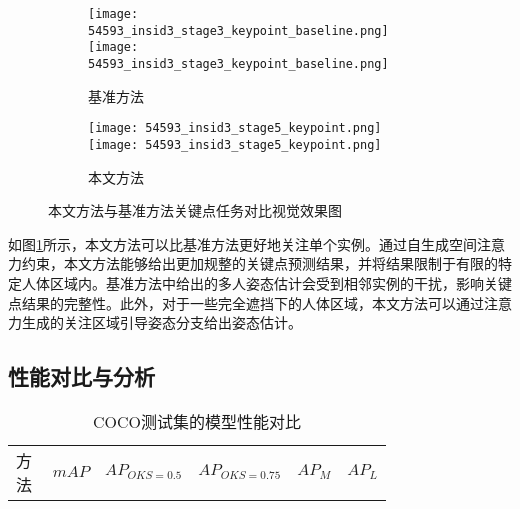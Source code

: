 \begin{outstandingabstract}
\begin{figure}[H]
\begin{minipage}{\linewidth}
    		\vskip5pt
    		\begin{subfigure}[b]{0.45\linewidth}
    			\centering
    			\begin{minipage}{\linewidth}
    				\texttt{[image: 54593\_insid3\_stage3\_keypoint\_baseline.png]}
    				{\texttt{[image: 54593\_insid3\_stage3\_keypoint\_baseline.png]}}
    			\end{minipage}
    			\caption{基准方法\cite{wei2016convolutional}}
    		\end{subfigure}
    		\begin{subfigure}[b]{0.45\linewidth}
    			\centering
    			\begin{minipage}{\linewidth}
    				\texttt{[image: 54593\_insid3\_stage5\_keypoint.png]}
    				{\texttt{[image: 54593\_insid3\_stage5\_keypoint.png]}}
    			\end{minipage}
    			\caption{本文方法}
    		\end{subfigure}
    	\end{minipage}
    	\caption{本文方法与基准方法关键点任务对比视觉效果图}
    	\label{fig:comparison_keypoint}
    \end{figure}
	如图\ref{fig:comparison_keypoint}所示，本文方法可以比基准方法更好地关注单个实例。通过自生成空间注意力约束，本文方法能够给出更加规整的关键点预测结果，并将结果限制于有限的特定人体区域内。基准方法中给出的多人姿态估计会受到相邻实例的干扰，影响关键点结果的完整性。此外，对于一些完全遮挡下的人体区域，本文方法可以通过注意力生成的关注区域引导姿态分支给出姿态估计。
    
    \subsection{性能对比与分析}
    \begin{table*}[ht]
    	\centering
    	\caption{COCO测试集的模型性能对比}
    	\label{tab:mAPCOCObenchmark}
    	\begin{minipage}[t]{0.8\linewidth}
    		\begin{tabular}{p{0.25\linewidth}p{0.1\linewidth}<{\centering}p{0.1\linewidth}<{\centering}p{0.1\linewidth}<{\centering}p{0.1\linewidth}<{\centering}p{0.1\linewidth}<{\centering}}
    			\hline
    			方法 & \multicolumn{1}{c}{$mAP$} & \multicolumn{1}{c}{$AP_{OKS=0.5}$} & \multicolumn{1}{c}{$AP_{OKS=0.75}$}
    			& \multicolumn{1}{c}{$AP_M$} & \multicolumn{1}{c}{$AP_L$} \\
    			

\end{tabular}
\end{minipage}
\end{table*}
\end{outstandingabstract}
